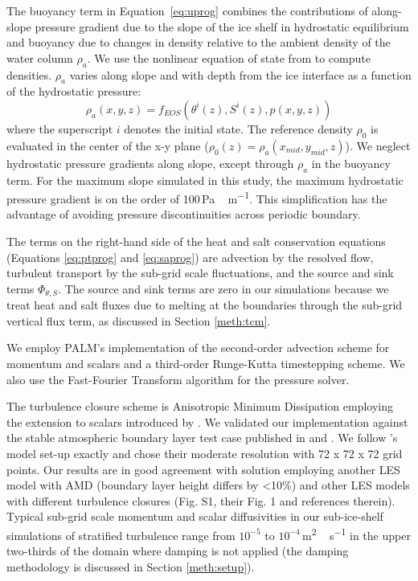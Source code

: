 \documentclass[tc, manuscript]{copernicus}
\begin{document}
The buoyancy term in Equation~\ref{eq:uprog} combines the contributions of along-slope pressure gradient due to the slope of the ice shelf in hydrostatic equilibrium and buoyancy due to changes in density relative to the ambient density of the water column $\rho_a$. We use the nonlinear equation of state from \citet{jackett_algorithms_2006} to compute densities. $\rho_a$ varies along slope and with depth from the ice interface as a function of the hydrostatic pressure: 
\begin{equation}
    \rho_a(x,y,z) = f_{EOS}\left(\theta^i(z),S^i(z),p(x,y,z)\right)
\end{equation}
where the superscript $i$ denotes the initial state. The reference density $\rho_0$ is evaluated in the center of the x-y plane ($\rho_0(z) = \rho_a(x_{mid},y_{mid},z)$). We neglect hydrostatic pressure gradients along slope, except through $\rho_a$ in the buoyancy term. For the maximum slope simulated in this study, the maximum hydrostatic pressure gradient is on the order of 100\,\unit{Pa\,m^{-1}}. This simplification has the advantage of avoiding pressure discontinuities across periodic boundary. 

The terms on the right-hand side of the heat and salt conservation equations (Equations \ref{eq:ptprog} and \ref{eq:saprog}) are advection by the resolved flow, turbulent transport by the sub-grid scale fluctuations, and the source and sink terms  $\Phi_{\theta,S}$. The source and sink terms are zero in our simulations because we treat heat and salt fluxes due to melting at the boundaries through the sub-grid vertical flux term, as discussed in Section \ref{meth:tcm}. 

We employ PALM's implementation of the \citet{piacsek_conservation_1970} second-order advection scheme for momentum and scalars and a third-order Runge-Kutta timestepping scheme. We also use the \citet{temperton_generalized_1992} Fast-Fourier Transform algorithm for the pressure solver. 

The turbulence closure scheme is Anisotropic Minimum Dissipation \cite[AMD;][]{rozema_minimum-dissipation_2015} employing the extension to scalars introduced by \citet{abkar_minimum-dissipation_2016}. We validated our implementation against the stable atmospheric boundary layer test case published in \citet{abkar_large-eddy_2017} and \citet{stoll_large-eddy_2008}. We follow \citet[]['s]{abkar_large-eddy_2017}'s model set-up exactly and chose their moderate resolution with 72 x 72 x 72 grid points. Our results are in good agreement with \citet[]['s]{abkar_large-eddy_2017} solution employing another LES model with AMD (boundary layer height differs by <10\%) and other LES models with different turbulence closures (Fig. S1, their Fig. 1 and references therein). Typical sub-grid scale momentum and scalar diffusivities in our sub-ice-shelf simulations of stratified turbulence range from $10^{-5}$ to $10^{-4}$\,\unit{m^2\,s^{-1}} in the upper two-thirds of the domain where damping is not applied (the damping methodology is discussed in Section \ref{meth:setup}). 
\end{document}
